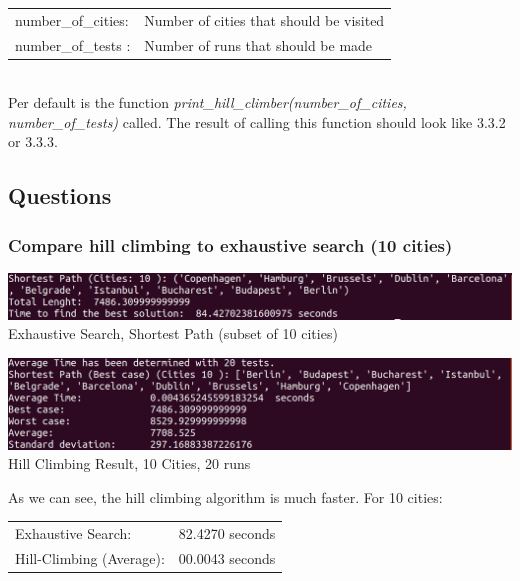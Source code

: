 \documentclass[10pt,a4paper]{article}
\begin{document}
	\begin{tabular} {l l}
	number\_of\_cities: & Number of cities that should be visited \\
	number\_of\_tests : & Number of runs that should be made       \\
	\end{tabular}
	\\
	Per default is the function \textit{print\_hill\_climber(number\_of\_cities, number\_of\_tests)} called. The result of calling this function should look like 3.3.2 or 3.3.3.
	\subsection{Questions}
	\subsubsection{Compare hill climbing to exhaustive search (10 cities)}
	\begin{center}
		\includegraphics[width=1.0\linewidth]{pictures/exhaustiveSearch/cities10}
		\\
		Exhaustive Search, Shortest Path (subset of 10 cities)
		\\
	\end{center}

	\begin{center}
		\includegraphics[width=1\linewidth]{pictures/hillClimbing/cities10}
		\\
		Hill Climbing Result, 10 Cities, 20 runs 
		\\	
	\end{center}
		As we can see, the hill climbing algorithm is much faster. For 10 cities:
		\\
		\begin{tabular}{ l l } 
		Exhaustive Search: & 82.4270 seconds \\
		Hill-Climbing (Average): & 00.0043 seconds  \\	
		\end{tabular}
	
\end{document}
